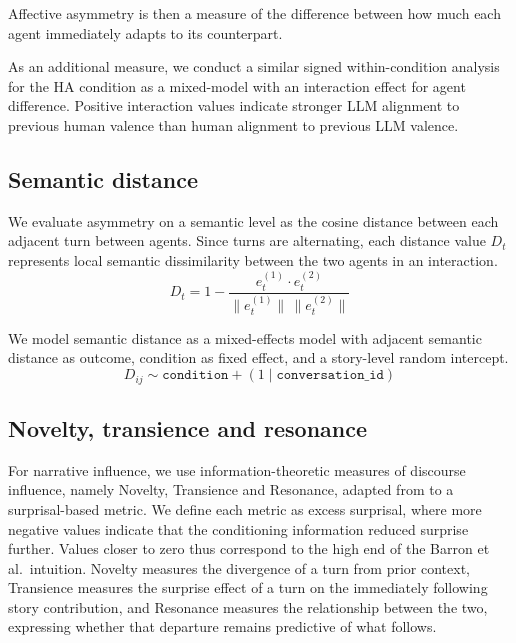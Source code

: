 \documentclass[11pt]{article}
\begin{document}
Affective asymmetry is then a measure of the difference between how much each agent immediately adapts to its counterpart. 

As an additional measure, we conduct a similar signed within-condition analysis for the HA condition as a mixed-model with an interaction effect for agent difference. Positive interaction values indicate stronger LLM alignment to previous human valence than human alignment to previous LLM valence.


\subsection{Semantic distance}  
We evaluate asymmetry on a semantic level as the cosine distance between each adjacent turn between agents. Since turns are alternating, each distance value $D_t$ represents local semantic dissimilarity between the two agents in an interaction. 
\begin{equation}
    D_t
    =
    1
    -
    \frac{
    e_t^{(1)} \cdot e_t^{(2)}
    }{
    \|e_t^{(1)}\| \, \|e_t^{(2)}\|
    }
\end{equation}

We model semantic distance as a mixed-effects model with adjacent semantic distance as outcome, condition as fixed effect, and a story-level random intercept.
\begin{equation}
    D_{ij} \sim \texttt{condition} + (1 \mid \texttt{conversation\_id})
\end{equation}

\subsection{Novelty, transience and resonance}
For narrative influence, we use information-theoretic measures of discourse influence, namely Novelty, Transience and Resonance, adapted from \citet{barron2018individuals} to a surprisal-based metric. We define each metric as excess surprisal, where more negative values indicate that the conditioning information reduced surprise further. Values closer to zero thus correspond to the high end of the Barron et al.\ intuition. Novelty measures the divergence of a turn from prior context, Transience measures the surprise effect of a turn on the immediately following story contribution, and Resonance measures the relationship between the two, expressing whether that departure remains predictive of what follows.
\end{document}
